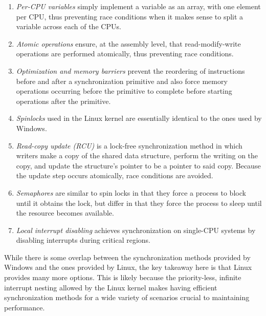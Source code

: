 \documentclass[onecolumn, draftclsnofoot,10pt, compsoc]{IEEEtran}
\begin{document}
\begin{enumerate}
\item \textit{Per-CPU variables} simply implement a variable as an array, with one element per CPU, thus preventing race conditions when it makes sense to split a variable across each of the CPUs.
\item \textit{Atomic operations} ensure, at the assembly level, that read-modify-write operations are performed atomically, thus preventing race conditions.
\item \textit{Optimization and memory barriers} prevent the reordering of instructions before and after a synchronization primitive and also force memory operations occurring before the primitive to complete before starting operations after the primitive.
\item \textit{Spinlocks} used in the Linux kernel are essentially identical to the ones used by Windows.
\item \textit{Read-copy update (RCU)} is a lock-free synchronization method in which writers make a copy of the shared data structure, perform the writing on the copy, and update the structure's pointer to be a pointer to said copy. Because the update step occurs atomically, race conditions are avoided.
\item \textit{Semaphores} are similar to spin locks in that they force a process to block until it obtains the lock, but differ in that they force the process to sleep until the resource becomes available.
\item \textit{Local interrupt disabling} achieves synchronization on single-CPU systems by disabling interrupts during critical regions.
\end{enumerate}
While there is some overlap between the synchronization methods provided by Windows and the ones provided by Linux, the key takeaway here is that Linux provides many more options. This is likely because the priority-less, infinite interrupt nesting allowed by the Linux kernel makes having efficient synchronization methods for a wide variety of scenarios crucial to maintaining performance.
\end{document}
